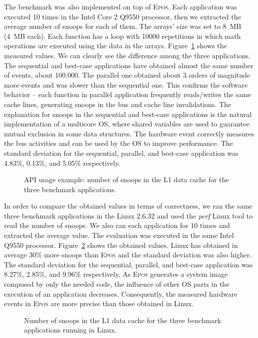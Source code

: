 \documentclass[conference]{IEEEtran}
\newcommand{\fig}[4][ht!]{
	\begin{figure}[#1]
	{\centering{\texttt{[image: fig/\#2]}}\par}
	\caption{#3}
	\label{fig:#2}
	\end{figure}
}
\begin{document}
The benchmark was also implemented on top of \textsc{Epos}. Each application was executed 10 times in the Intel Core 2 Q9550 processor, then we extracted the average number of snoops for each of them. The arrays' size was set to 8~MB (4~MB each). Each function has a loop with 10000 repetitions in which math operations are executed using the data in the arrays. Figure~\ref{fig:l1_data_cache_snooped} shows the measured values. We can clearly see the difference among the three applications. The sequential and best-case applications have obtained almost the same number of events, about 100.000. The parallel one obtained about 3 orders of magnitude more events and was slower than the sequential one. This confirms the software behavior -- each function in parallel application frequently reads/writes the same cache lines, generating snoops in the bus and cache line invalidations. The explanation for snoops in the sequential and best-case applications is the natural implementation of a multicore OS, where shared variables are used to guarantee mutual exclusion in some data structures. The hardware event correctly measures the bus activities and can be used by the OS to improve performance. The standard deviation for the sequential, parallel, and best-case application was 4.83\%, 0.13\%, and 5.05\% respectively. 

\fig{l1_data_cache_snooped}{API usage example: number of snoops in the L1 data cache for the three benchmark applications.}{scale=.7}

In order to compare the obtained values in terms of correctness, we ran the same three benchmark applications in the Linux 2.6.32 and used the \emph{perf} Linux tool to read the number of snoops. We also ran each application for 10 times and extracted the average value. The evaluation was executed in the same Intel Q9550 processor. Figure~\ref{fig:l1_data_cache_snooped_linux} shows the obtained values. Linux has obtained in average 30\% more snoops than \textsc{Epos} and the standard deviation was also higher. The standard deviation for the sequential, parallel, and best-case application was 8.27\%, 2.85\%, and 9.96\% respectively. As \textsc{Epos} generates a system image composed by only the needed code, the influence of other OS parts in the execution of an application decreases. Consequently, the measured hardware events in \textsc{Epos} are more precise than those obtained in Linux.

\fig{l1_data_cache_snooped_linux}{Number of snoops in the L1 data cache for the three benchmark applications running in Linux.}{scale=.7}
\end{document}
